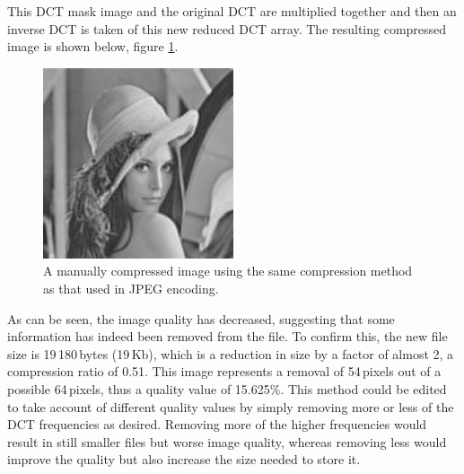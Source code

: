 This DCT mask image and the original DCT are multiplied together and then an inverse DCT is taken of this new reduced DCT array. The resulting compressed image is shown below, figure \ref{fig:mancompresslena}.
\begin{figure}[ht]
	\centering
	\includegraphics[width=0.5\textwidth]{lena_manual_compression.jpg}
	\caption{A manually compressed image using the same compression method as that used in JPEG encoding.\label{fig:mancompresslena}}
\end{figure}

As can be seen, the image quality has decreased, suggesting that some information has indeed been removed from the file. To confirm this, the new file size is 19\,180\,bytes (19\,Kb), which is a reduction in size by a factor of almost 2, a compression ratio of 0.51. This image represents a removal of 54\,pixels out of a possible 64\,pixels, thus a quality value of 15.625\%. This method could be edited to take account of different quality values by simply removing more or less of the DCT frequencies as desired. Removing more of the higher frequencies would result in still smaller files but worse image quality, whereas removing less would improve the quality but also increase the size needed to store it.

